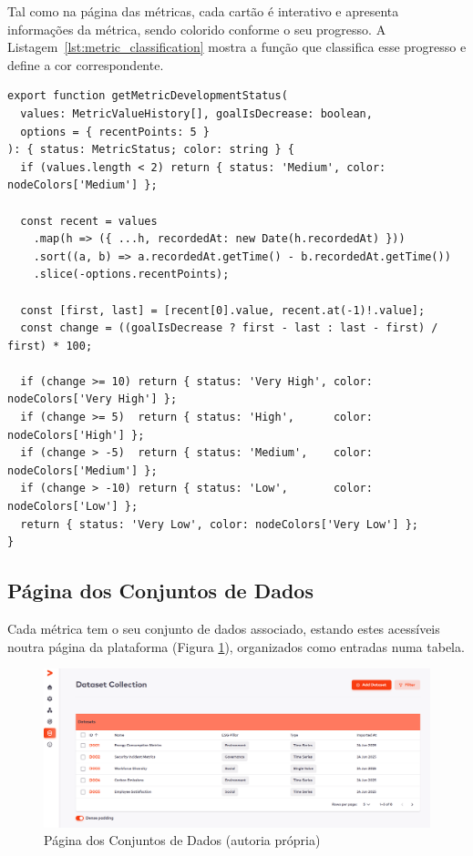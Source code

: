 Tal como na página das métricas, cada cartão é interativo e apresenta informações da métrica, sendo colorido conforme o seu progresso. A Listagem~\ref{lst:metric_classification} mostra a função que classifica esse progresso e define a cor correspondente.

\begin{lstlisting}[style=customts, caption={Classificação do progresso de uma métrica}, label={lst:metric_classification}]
export function getMetricDevelopmentStatus(
  values: MetricValueHistory[], goalIsDecrease: boolean,
  options = { recentPoints: 5 }
): { status: MetricStatus; color: string } {
  if (values.length < 2) return { status: 'Medium', color: nodeColors['Medium'] };

  const recent = values
    .map(h => ({ ...h, recordedAt: new Date(h.recordedAt) }))
    .sort((a, b) => a.recordedAt.getTime() - b.recordedAt.getTime())
    .slice(-options.recentPoints);

  const [first, last] = [recent[0].value, recent.at(-1)!.value];
  const change = ((goalIsDecrease ? first - last : last - first) / first) * 100;

  if (change >= 10) return { status: 'Very High', color: nodeColors['Very High'] };
  if (change >= 5)  return { status: 'High',      color: nodeColors['High'] };
  if (change > -5)  return { status: 'Medium',    color: nodeColors['Medium'] };
  if (change > -10) return { status: 'Low',       color: nodeColors['Low'] };
  return { status: 'Very Low', color: nodeColors['Very Low'] };
}
\end{lstlisting}

\subsection{Página dos Conjuntos de Dados}

Cada métrica tem o seu conjunto de dados associado, estando estes acessíveis noutra página da plataforma (Figura \ref{fig:dataset_done}), organizados como entradas numa tabela.

\begin{figure}[H]
    \centering
    \includegraphics[width=\linewidth,keepaspectratio]{frontmatter/assets/platform_prints/dataset/dataset_done.png}
    \caption{Página dos Conjuntos de Dados (autoria própria)}
    \label{fig:dataset_done}
\end{figure}

